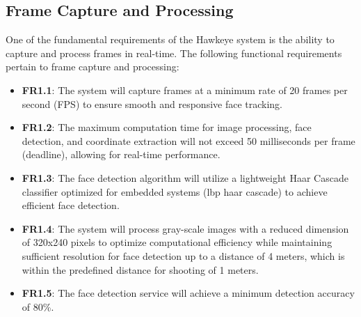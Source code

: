 \documentclass[a4paper,11pt]{article}%
\begin{document}
\subsection{Frame Capture and Processing}
One of the fundamental requirements of the Hawkeye system is the ability to capture and process frames in real-time. The following functional requirements pertain to frame capture and processing:
\begin{itemize}
    \item \textbf{FR1.1}: The system will capture frames at a minimum rate of 20 frames per second (FPS) to ensure smooth and responsive face tracking.
    \item \textbf{FR1.2}: The maximum computation time for image processing, face detection, and coordinate extraction will not exceed 50 milliseconds per frame (deadline), allowing for real-time performance.
    \item \textbf{FR1.3}: The face detection algorithm will utilize a lightweight Haar Cascade classifier optimized for embedded systems (lbp haar cascade) to achieve efficient face detection.
    \item \textbf{FR1.4}: The system will process gray-scale images with a reduced dimension of 320x240 pixels to optimize computational efficiency while maintaining sufficient resolution for face detection up to a distance of 4 meters, which is within the predefined distance for shooting of 1 meters.
    \item \textbf{FR1.5}: The face detection service will achieve a minimum detection accuracy of 80\%.
\end{itemize}
\end{document}

